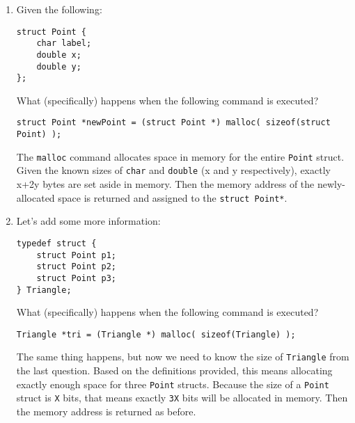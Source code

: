 \begin{enumerate}
\item Given the following:
\begin{lstlisting}[numbers=none]
struct Point {
	char label;
	double x;
	double y;
};
\end{lstlisting}

What (specifically) happens when the following command is executed?

\hspace{15mm} \texttt{struct Point *newPoint = (struct Point *) malloc( sizeof(struct Point) );}

\begin{answer}
The \texttt{malloc} command allocates space in memory for the entire \texttt{Point} struct.
Given the known sizes of \texttt{char} and \texttt{double} (x and y respectively), exactly x+2y bytes are set aside in memory.
Then the memory address of the newly-allocated space is returned and assigned to the \texttt{struct Point*}.
\end{answer}

\item Let's add some more information:
\begin{lstlisting}[numbers=none]
typedef struct {
	struct Point p1;
	struct Point p2;
	struct Point p3;
} Triangle;
\end{lstlisting}

What (specifically) happens when the following command is executed?

\hspace{15mm} \texttt{Triangle *tri = (Triangle *) malloc( sizeof(Triangle) );}

\begin{answer}
The same thing happens, but now we need to know the size of \texttt{Triangle} from the last question.
Based on the definitions provided, this means allocating exactly enough space for three \texttt{Point} structs.
Because the size of a \texttt{Point} struct is \texttt{X} bits, that means exactly \texttt{3X} bits will be allocated in memory.
Then the memory address is returned as before.
\end{answer}
\end{enumerate}
